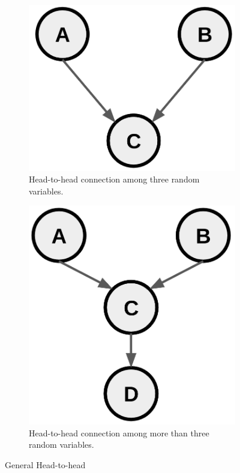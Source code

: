 \begin{figure}
\centering
\begin{subfigure}[t]{0.49\textwidth}
\centering
\includegraphics[width=\textwidth]{images/generalHeadToHead1.png}
\caption{Head-to-head connection among three random variables.}
\label{fig:generalHeadToHead1}
\end{subfigure}
\hfill
\begin{subfigure}[t]{0.49\textwidth}
\centering
\includegraphics[width=\linewidth]{images/generalHeadToHead2.png}
\caption{Head-to-head connection among more than three random variables.}
\label{fig:generalHeadToHead2}
\end{subfigure}

\caption{General Head-to-head}
\label{fig:generalHeadToHead}
\end{figure}

